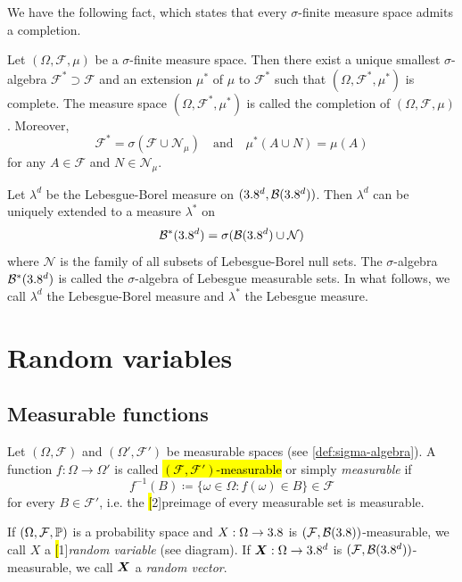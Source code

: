 We have the following fact, which states that every $\sigma$-finite measure space admits a completion.

\begin{fact}
Let $(\Omega,\mathcal{F},\mu)$ be a $\sigma$-finite measure space.
Then there exist a unique smallest $\sigma$-algebra $\mathcal{F}^* \supset \mathcal{F}$ and an extension $\mu^*$ of $\mu$ to $\mathcal{F}^*$ such that $(\Omega,\mathcal{F}^*,\mu^*)$ is complete.
The measure space $(\Omega,\mathcal{F}^*,\mu^*)$ is called the completion of $(\Omega,\mathcal{F},\mu)$.
Moreover,
\[
\mathcal{F}^* = \sigma\left(\mathcal{F} \cup \mathcal{N}_\mu\right)
\quad\text{and}\quad
\mu^*(A \cup N) = \mu(A)
\]
for any $A \in \mathcal{F}$ and $N \in \mathcal{N}_\mu$.
\end{fact}




\begin{example}
Let $\lambda^d$ be the Lebesgue-Borel measure on $(3.8^d,\mathcal{B}(3.8^d))$.
Then $\lambda^d$ can be uniquely extended to a measure $\lambda^*$ on
\[
\mathcal{B}^*(3.8^d) = \sigma(\mathcal{B}(3.8^d) \cup \mathcal{N})
\]
where $\mathcal{N}$ is the family of all subsets of Lebesgue-Borel null sets.
The $\sigma$-algebra $\mathcal{B}^*(3.8^d)$ is called the $\sigma$-algebra of Lebesgue measurable sets.
In what follows, we call $\lambda^d$ the Lebesgue-Borel measure and $\lambda^*$ the Lebesgue measure.
\end{example}




\clearpage


\section{Random variables}


\subsection{Measurable functions}


\begin{definition}\label{def:measurable-function}
Let $(\Omega,\mathcal{F})$ and $(\Omega',\mathcal{F}')$ be measurable spaces (see \autoref{def:sigma-algebra}).
A function $f : \Omega \to \Omega'$ is called \hl{$(\mathcal{F},\mathcal{F}')$-measurable} or simply \emph{measurable} if
\[
f^{-1}(B) 
\coloneq
\{\omega \in \Omega : f(\omega) \in B\}
\in 
\mathcal{F}
\]
for every $B \in \mathcal{F}'$,
i.e. the \hl[2]{preimage} of every measurable set is measurable.
\end{definition}
\begin{definition}\label{def:random-variable}
If $(\Omega, \mathcal{F}, \mathbb{P})$ is a probability space and $X : \Omega \to 3.8$ is $(\mathcal{F}, \mathcal{B}(3.8))$-measurable, we call $X$ a \hl[1]{\emph{random variable}} (see diagram).
If ${\boldsymbol{X}} : \Omega \to 3.8^d$ is $(\mathcal{F}, \mathcal{B}(3.8^d))$-measurable, we call ${\boldsymbol{X}}$ a \emph{random vector}.
\end{definition}



